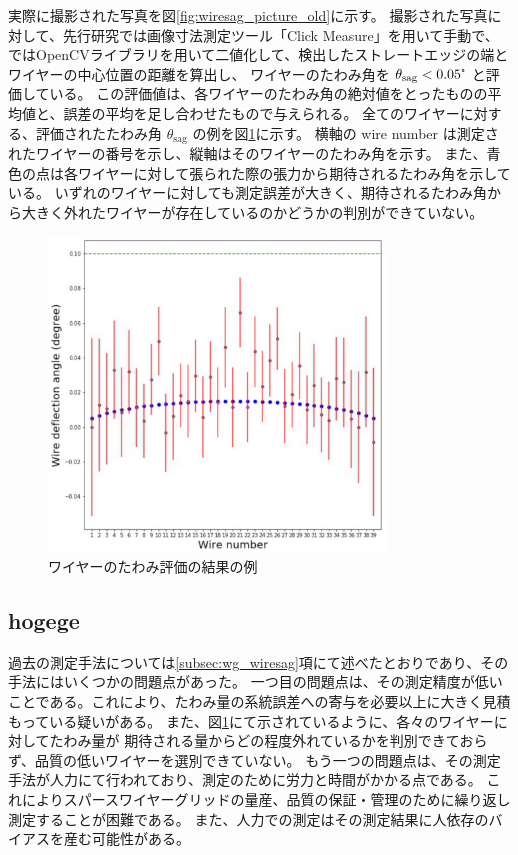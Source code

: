 \documentclass[../../main.tex]{subfiles}
\begin{document}
実際に撮影された写真を図\ref{fig:wiresag_picture_old}に示す。
撮影された写真に対して、先行研究\cite{swg:murata}では画像寸法測定ツール「Click Measure」を用いて手動で、
\cite{swg:iijima}ではOpenCVライブラリを用いて二値化して、検出したストレートエッジの端とワイヤーの中心位置の距離を算出し、
ワイヤーのたわみ角を $\theta_{\mathrm{sag}} < 0.05\tcdegree$ と評価している。
この評価値は、各ワイヤーのたわみ角の絶対値をとったものの平均値と、誤差の平均を足し合わせたもので与えられる。
全てのワイヤーに対する、評価されたたわみ角 $\theta_{\mathrm{sag}}$ の例を図\ref{fig:wiresag_result_old}に示す。
横軸の wire number は測定されたワイヤーの番号を示し、縦軸はそのワイヤーのたわみ角を示す。
また、青色の点は各ワイヤーに対して張られた際の張力から期待されるたわみ角を示している。
いずれのワイヤーに対しても測定誤差が大きく、期待されるたわみ角から大きく外れたワイヤーが存在しているのかどうかの判別ができていない。
\begin{figure}[H]
    \centering
    \includegraphics[width=0.8\textwidth]{wiregrid/wiresag_result_old.pdf}
    \caption{ワイヤーのたわみ評価の結果の例\cite{swg:murata}}
    \label{fig:wiresag_result_old}    
\end{figure}

\subsection{hogege}
過去の測定手法については\ref{subsec:wg_wiresag}項にて述べたとおりであり、その手法にはいくつかの問題点があった。
一つ目の問題点は、その測定精度が低いことである。これにより、たわみ量の系統誤差への寄与を必要以上に大きく見積もっている疑いがある。
また、図\ref{fig:wiresag_result_old}にて示されているように、各々のワイヤーに対してたわみ量が
期待される量からどの程度外れているかを判別できておらず、品質の低いワイヤーを選別できていない。
もう一つの問題点は、その測定手法が人力にて行われており、測定のために労力と時間がかかる点である。
これによりスパースワイヤーグリッドの量産、品質の保証・管理のために繰り返し測定することが困難である。
また、人力での測定はその測定結果に人依存のバイアスを産む可能性がある。
\end{document}
